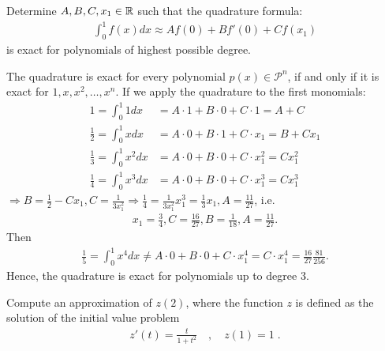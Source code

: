 \begin{problem}
 
 \begin{subproblem}[4]
 Determine $A,B,C, x_1 \in \mathbb{R}$ such that the quadrature formula:
 \begin{align} \label{eq:gen_hermite_quad}
  \int_0^1 f(x) dx \approx A f(0) + B f'(0) + C f(x_1)
 \end{align}
 is exact for polynomials of highest possible degree.
 
 \cprotEnv \begin{solution}
  The quadrature is exact for every polynomial $p(x) \in \mathcal{P}^n$, if and only if it is exact for $1,x,x^2,\dots,x^n$. If we apply the quadrature to the first monomials:
  \begin{align}
   1 = \int_0^1 1 dx & = A \cdot 1 + B \cdot 0 + C \cdot 1 = A + C\\
   \frac{1}{2} = \int_0^1 x dx & = A \cdot 0 + B \cdot 1 + C \cdot x_1 = B + C x_1 \\
   \frac{1}{3} = \int_0^1 x^2 dx & = A \cdot 0 + B \cdot 0 + C \cdot x_1^2 = C x_1^2 \\
   \frac{1}{4} = \int_0^1 x^3 dx & = A \cdot 0 + B \cdot 0 + C \cdot x_1^3 = C x_1^3
  \end{align}
  $\Rightarrow B = \frac{1}{2} - C x_1, C = \frac{1}{3 x_1^2} \Rightarrow \frac{1}{4} = \frac{1}{3 x_1^2} x_1^3 = \frac{1}{3} x_1, A = \frac{11}{27}$, i.e.
  \begin{align}
  x_1 = \frac{3}{4}, C = \frac{16}{27}, B = \frac{1}{18}, A = \frac{11}{27}.
  \end{align}
  Then
  \begin{align}
   \frac{1}{5} = \int_0^1 x^4 dx \neq A \cdot 0 + B \cdot 0 + C \cdot x_1^4 = C \cdot x_1^4 = \frac{16}{27} \frac{81}{256}.
  \end{align}
  Hence, the quadrature is exact for polynomials up to degree $3$.
 \end{solution}
 
 \end{subproblem}
 
 \begin{subproblem}[4]
 
 Compute an approximation of $z(2)$, where the function $z$ is defined as the solution of the initial value problem
 \begin{align}
  z'(t) = \frac{t}{1 + t^2}\quad,\quad z(1) = 1\;.
 \end{align}
 

\end{subproblem}
\end{problem}

